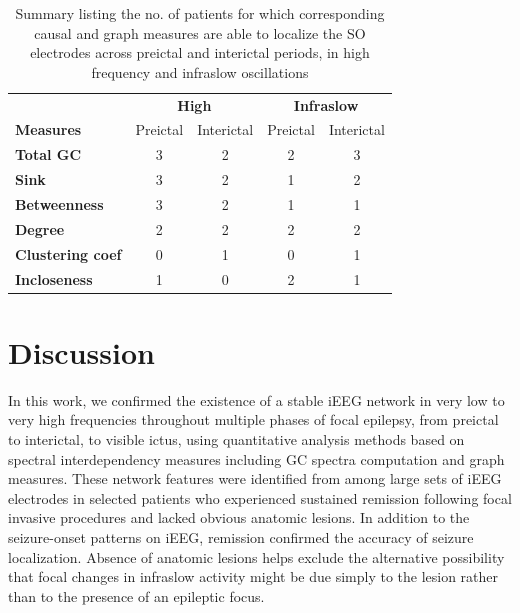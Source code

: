\begin{table}[]
\renewcommand{\arraystretch}{1.2} %
\setlength{\tabcolsep}{12pt} %
\centering
	\begin{tabular}{|l |c|c|c|c|}
	\hline
	  & \multicolumn{2}{c|}{\textbf{High}} & \multicolumn{2}{c|}{\textbf{Infraslow}} \\ \cline{2-5}
	\multirow{-2}{*}{\textbf{Measures}} & Preictal        & Interictal       & Preictal       & Interictal       \\ 
	\hline
	\textbf{Total GC}                   & 3               & 2                & 2              & 3                \\ \hline
	\textbf{Sink}                       & 3               & 2                & 1              & 2                \\ \hline
	\textbf{Betweenness}                & 3               & 2                & 1              & 1                \\ \hline
	\textbf{Degree}                     & 2               & 2                & 2              & 2                \\ \hline
	\textbf{Clustering coef}            & 0               & 1                & 0              & 1                \\ \hline
	\textbf{Incloseness}                & 1               & 0                & 2              & 1                \\ \hline
	\end{tabular}

	\caption{Summary listing the no. of patients for which corresponding causal and graph measures are able to localize the SO electrodes across preictal and interictal periods, in high frequency and infraslow oscillations}
	\label{table:summary}
\end{table}


\section{Discussion}
\label{sec:discussion}
In this work, we confirmed the existence of a stable iEEG network in very low to very high frequencies throughout multiple phases of focal epilepsy, from preictal to interictal, to visible ictus, using quantitative analysis methods based on spectral interdependency measures including GC spectra computation and graph measures. These network features were identified from among large sets of iEEG electrodes in selected patients who experienced sustained remission following focal invasive procedures and lacked obvious anatomic lesions. In addition to the seizure-onset patterns on iEEG, remission confirmed the accuracy of seizure localization.  Absence of anatomic lesions helps exclude the alternative possibility that focal changes in infraslow activity might be due simply to the lesion rather than to the presence of an epileptic focus.

